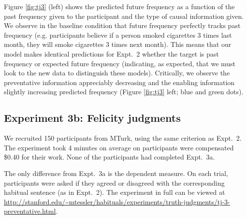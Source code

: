 \documentclass[10pt,letterpaper]{article}
\begin{document}
Figure \ref{fig:tj3} (left) shows the predicted future frequency as a function of the past frequency given to the participant and the type of causal information given. 
We observe in the baseline condition that future frequency perfectly tracks past frequency (e.g. participants believe if a person smoked cigarettes 3 times last month, they will smoke cigarettes 3 times next month). 
This means that our model makes identical predictions for Expt.~2 whether the target is past frequency or expected future frequency (indicating, as expected, that we must look to the new data to distinguish these models).
Critically, we observe the preventative information appreciably decreasing and the enabling information slightly increasing predicted frequency (Figure \ref{fig:tj3} left; blue and green dots).




\subsection{Experiment 3b: Felicity judgments}



We recruited 150 participants from MTurk, using the same criterion as Expt.~2.
The experiment took 4 minutes on average on participants were compensated \$0.40 for their work.
None of the participants had completed Expt.~3a.

The only difference from Expt.~3a is the dependent measure. 
On each trial, participants were asked if they agreed or disagreed with the corresponding habitual sentence (as in Expt.~2).
The experiment in full can be viewed at \url{http://stanford.edu/~mtessler/habituals/experiments/truth-judgments/tj-3-preventative.html}.
\end{document}
